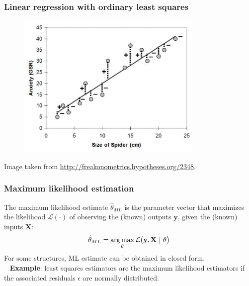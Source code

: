 \begin{frame}
	\frametitle{Linear regression with ordinary least squares}
	\begin{figure}[!h]
		\centering
		\includegraphics[width=0.8\textwidth]{img/linear-regression.jpg}
	\end{figure}
	\tiny{Image taken from \url{http://freakonometrics.hypotheses.org/2348}}.
\end{frame}


\begin{frame}
	\frametitle{Maximum likelihood estimation}
	The maximum likelihood estimate $\hat{\theta}_{ML}$ is the parameter vector that maximizes the likelihood $\mathcal{L}(\cdot)$ of observing the (known) outputs $\mathbf{y}$, given the (known) inputs $\mathbf{X}$:
	\begin{equation*}
	\hat{\theta}_{ML} = \operatorname*{arg\,max}_{\theta} \mathcal{L}\big(\mathbf{y}, \mathbf{X}\ |\ \theta \big)
	\end{equation*}
	\pause
	For some structures, ML estimate can be obtained in closed form.\\
	\ \newline
	\pause
	\textbf{Example}: least squares estimators are the maximum likelihood estimators if the associated residuals $\epsilon$ are normally distributed.
\end{frame}

